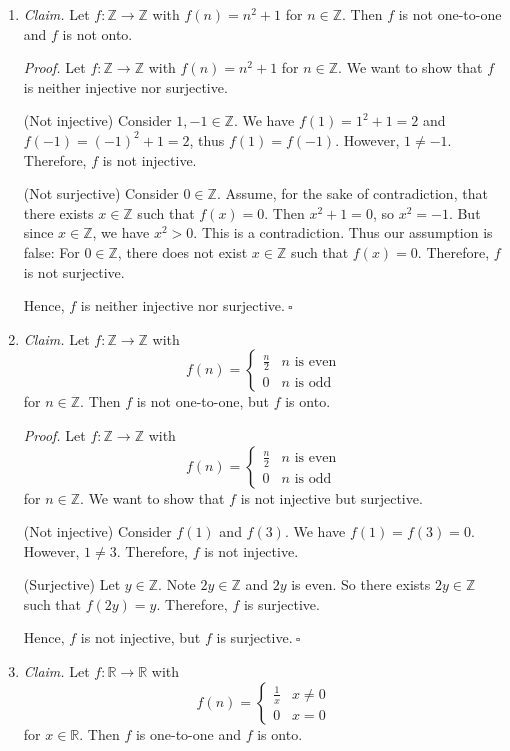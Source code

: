 \documentclass{article}
\newcommand{\Z}{\mathbb{Z}}
\newcommand{\R}{\mathbb{R}}
\theoremstyle{definition}
\begin{document}
\begin{solution}
\begin{enumerate}
\item\textit{Claim. }Let $f:\Z\to\Z$ with $f(n)=n^2+1$ for $n\in\Z$. Then $f$ is not one-to-one and $f$ is not onto.\newline

\textit{Proof. }Let $f:\Z\to\Z$ with $f(n)=n^2+1$ for $n\in\Z$. We want to show that $f$ is neither injective nor surjective.

(Not injective) Consider $1,-1\in\Z$. We have $f(1)=1^2+1=2$ and $f(-1)=(-1)^2+1=2$, thus $f(1)=f(-1)$. However, $1\neq -1$. Therefore, $f$ is not injective.

(Not surjective) Consider $0\in\Z$. Assume, for the sake of contradiction, that there exists $x\in\Z$ such that $f(x)=0$. Then $x^2+1=0$, so $x^2=-1$. But since $x\in\Z$, we have $x^2>0$. This is a contradiction. Thus our assumption is false: For $0\in\Z$, there does not exist $x\in\Z$ such that $f(x)=0$. Therefore, $f$ is not surjective.

Hence, $f$ is neither injective nor surjective.$~\square$
\item\textit{Claim. }Let $f:\Z\to\Z$ with 
\[f(n) = \begin{cases} 
\frac{n}{2}&n\text{ is even}\\
0&n\text{ is odd}
\end{cases}
\]
for $n\in\Z$. Then $f$ is not one-to-one, but $f$ is onto.\newline

\textit{Proof. }Let $f:\Z\to\Z$ with 
\[f(n) = \begin{cases} 
\frac{n}{2}&n\text{ is even}\\
0&n\text{ is odd}
\end{cases}
\]
for $n\in\Z$. We want to show that $f$ is not injective but surjective.

(Not injective) Consider $f(1)$ and $f(3)$. We have $f(1)=f(3)=0$. However, $1\neq 3$. Therefore, $f$ is not injective.

(Surjective) Let $y\in\Z$. Note $2y\in\Z$ and $2y$ is even. So there exists $2y\in\Z$ such that $f(2y)=y$. Therefore, $f$ is surjective.

Hence, $f$ is not injective, but $f$ is surjective.$~\square$
\item\textit{Claim. }Let $f:\R\to\R$ with 
\[f(n) = \begin{cases} 
\frac{1}{x}&x\neq 0\\
0&x=0
\end{cases}
\]
for $x\in\R$. Then $f$ is one-to-one and $f$ is onto.\newline


\end{enumerate}
\end{solution}
\end{document}
